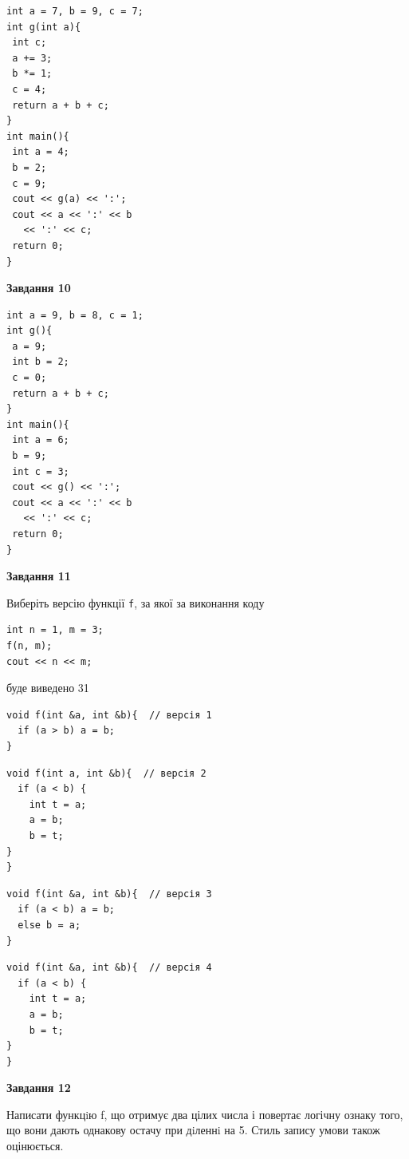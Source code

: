 \documentclass[12pt, ukrainian]{article}
\def\code#1{\Verb!#1!}
\begin{document}
{\begin {large}
\begin{minipage}[t]{7.0cm}
\begin{verbatim}
int a = 7, b = 9, c = 7;
int g(int a){
 int c;
 a += 3;
 b *= 1;
 c = 4;
 return a + b + c;
}
int main(){
 int a = 4;
 b = 2;
 c = 9;
 cout << g(a) << ':';
 cout << a << ':' << b 
   << ':' << c;
 return 0;
}
\end{verbatim}



\begin{center}
\textbf{Завдання 10}
\end{center}
\vspace{-8mm}

\begin{verbatim}
int a = 9, b = 8, c = 1;
int g(){
 a = 9;
 int b = 2;
 c = 0;
 return a + b + c;
}
int main(){
 int a = 6;
 b = 9;
 int c = 3;
 cout << g() << ':';
 cout << a << ':' << b 
   << ':' << c;
 return 0;
}
\end{verbatim}

\end{minipage}
\vline \hspace{1mm}
\begin{minipage}[t]{11.0cm}

\begin{center}
\textbf{Завдання 11}
\end{center}
Виберіть версію функції \code{f}, за якої за виконання коду
\begin{verbatim}
int n = 1, m = 3;
f(n, m);
cout << n << m;
\end{verbatim}

буде виведено 31

\begin{verbatim}
void f(int &a, int &b){  // версія 1
  if (a > b) a = b;
}
\end{verbatim}

\vspace{-8mm}\begin{verbatim}
void f(int a, int &b){  // версія 2
  if (a < b) {
    int t = a;
    a = b;
    b = t;
}  
}
\end{verbatim}

\vspace{-8mm}\begin{verbatim}
void f(int &a, int &b){  // версія 3
  if (a < b) a = b;
  else b = a;
}
\end{verbatim}

\vspace{-8mm}\begin{verbatim}
void f(int &a, int &b){  // версія 4
  if (a < b) {
    int t = a;
    a = b;
    b = t;
}  
}
\end{verbatim}



\begin{center}
\textbf{Завдання 12}
\end{center}

Написати функцiю f, що отримує два цілих числа і повертає логічну ознаку того, що вони дають однакову остачу при дiленнi на 5. Стиль запису умови також оцінюється.\par

\end{minipage}

\end {large}}
\end{document}
